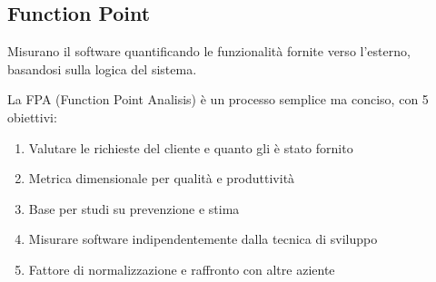 \documentclass{report}
\begin{document}
\subsection*{Function Point}
Misurano il software quantificando le funzionalità fornite verso l'esterno, basandosi sulla logica del sistema.

\noindent
La FPA (Function Point Analisis) è un processo semplice ma conciso, con 5 obiettivi:
\begin{enumerate}
    \item Valutare le richieste del cliente e quanto gli è stato fornito
    \item Metrica dimensionale per qualità e produttività
    \item Base per studi su prevenzione e stima
    \item Misurare software indipendentemente dalla tecnica di sviluppo
    \item Fattore di normalizzazione e raffronto con altre aziente
\end{enumerate}
\end{document}
